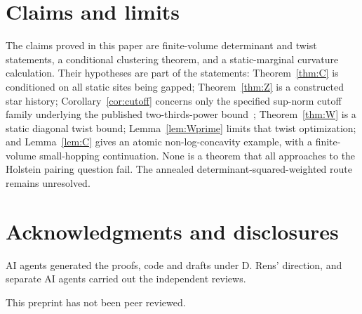 \documentclass[11pt]{article}
\theoremstyle{definition}
\theoremstyle{remark}
\begin{document}
\section{Claims and limits}

The claims proved in this paper are finite-volume determinant and twist statements, a conditional clustering theorem, and a static-marginal curvature calculation. Their hypotheses are part of the statements: Theorem~\ref{thm:C} is conditioned on all static sites being gapped; Theorem~\ref{thm:Z} is a constructed star history; Corollary~\ref{cor:cutoff} concerns only the specified sup-norm cutoff family underlying the published two-thirds-power bound~\cite{linear4}; Theorem~\ref{thm:W} is a static diagonal twist bound; Lemma~\ref{lem:Wprime} limits that twist optimization; and Lemma~\ref{lem:C} gives an atomic non-log-concavity example, with a finite-volume small-hopping continuation. None is a theorem that all approaches to the Holstein pairing question fail. The annealed determinant-squared-weighted route remains unresolved.

\section*{Acknowledgments and disclosures}

AI agents generated the proofs, code and drafts under D. Rens' direction, and separate AI agents carried out the independent reviews.

This preprint has not been peer reviewed.



\end{document}
